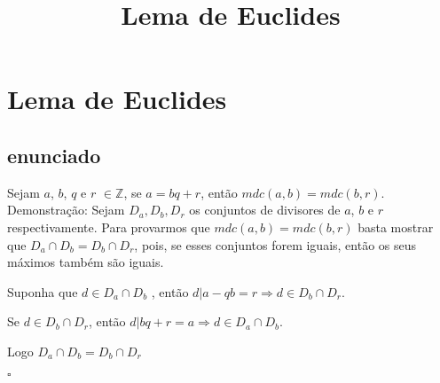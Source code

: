 \documentclass[12pt]{article}
\title{Lema de Euclides}
\begin{document}
\section{Lema de Euclides}
\subsection{enunciado}
Sejam $a$, $b$, $q$ e $r$ $\in \mathbb{Z}$, se $a=bq+r$, então $mdc(a,b)=mdc(b,r)$. $$ $$
Demonstração:
Sejam $D_{a}, D_{b}, D_{r}$ os conjuntos de divisores de $a$, $b$ e $r$ respectivamente. Para provarmos que $mdc(a,b)=mdc(b,r)$ basta mostrar que $D_{a} \cap D_{b} = D_{b} \cap D_{r}$, pois, se esses conjuntos forem iguais, então os seus máximos também são iguais. 

Suponha que $d \in D_{a} \cap D_{b}$ , então $d \vert a-qb=r \Rightarrow d \in D_{b} \cap D_{r}$.

Se $d \in D_{b} \cap D_{r}$, então $d \vert bq+r=a \Rightarrow d \in D_{a} \cap D_{b}$.

Logo $D_{a} \cap D_{b} = D_{b} \cap D_{r}$ 

$\square$
\end{document}
